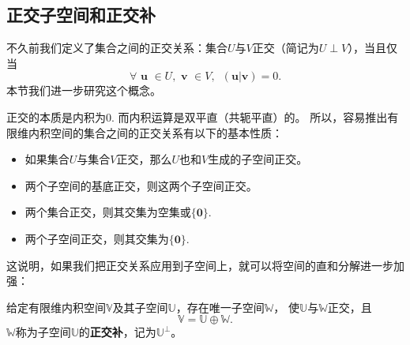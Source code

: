 \documentclass[12pt,UTF8]{ctexbook}
\begin{document}
\subsection{正交子空间和正交补}
不久前我们定义了集合之间的正交关系：集合$U$与$V$正交（简记为$U\perp V$），当且仅当
$$ \forall \,\, \mathbf{u}\,\, \in U, \,\, \mathbf{v} \,\, \in V, \,\,\, (\mathbf{u} | \mathbf{v}) = 0.$$
本节我们进一步研究这个概念。

正交的本质是内积为0. 而内积运算是双平直（共轭平直）的。
所以，容易推出有限维内积空间的集合之间的正交关系有以下的基本性质：
\begin{itemize}
    \item 如果集合$U$与集合$V$正交，那么$U$也和$V$生成的子空间正交。
    \item 两个子空间的基底正交，则这两个子空间正交。
    \item 两个集合正交，则其交集为空集或$\{\mathbf{0}\}$.
    \item 两个子空间正交，则其交集为$\{\mathbf{0}\}$.
\end{itemize}

这说明，如果我们把正交关系应用到子空间上，就可以将空间的直和分解进一步加强：
\begin{pp}\label{pp:7_7}
    给定有限维内积空间$\mathbb{V}$及其子空间$\mathbb{U}$，存在唯一子空间$\mathbb{W}$，
    使$\mathbb{U}$与$\mathbb{W}$正交，且
    $$ \mathbb{V} = \mathbb{U} \oplus \mathbb{W}.$$
    $\mathbb{W}$称为子空间$\mathbb{U}$的\textbf{正交补}，记为$\mathbb{U}^{\perp}$。
\end{pp}
\end{document}
